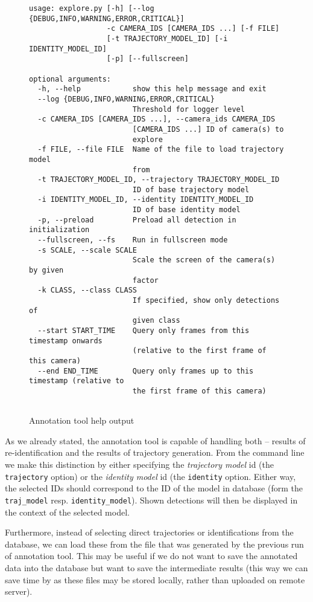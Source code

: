 \begin{figure}
    \begin{verbatim}
usage: explore.py [-h] [--log {DEBUG,INFO,WARNING,ERROR,CRITICAL}]
                  -c CAMERA_IDS [CAMERA_IDS ...] [-f FILE]
                  [-t TRAJECTORY_MODEL_ID] [-i IDENTITY_MODEL_ID]
                  [-p] [--fullscreen]

optional arguments:
  -h, --help            show this help message and exit
  --log {DEBUG,INFO,WARNING,ERROR,CRITICAL}
                        Threshold for logger level
  -c CAMERA_IDS [CAMERA_IDS ...], --camera_ids CAMERA_IDS
                        [CAMERA_IDS ...] ID of camera(s) to
                        explore
  -f FILE, --file FILE  Name of the file to load trajectory model
                        from
  -t TRAJECTORY_MODEL_ID, --trajectory TRAJECTORY_MODEL_ID
                        ID of base trajectory model
  -i IDENTITY_MODEL_ID, --identity IDENTITY_MODEL_ID
                        ID of base identity model
  -p, --preload         Preload all detection in initialization
  --fullscreen, --fs    Run in fullscreen mode
  -s SCALE, --scale SCALE
                        Scale the screen of the camera(s) by given
                        factor
  -k CLASS, --class CLASS
                        If specified, show only detections of
                        given class
  --start START_TIME    Query only frames from this timestamp onwards
                        (relative to the first frame of this camera)
  --end END_TIME        Query only frames up to this timestamp (relative to
                        the first frame of this camera)


    \end{verbatim}
    \caption{Annotation tool help output}
    \label{fig:annotation_tool_help}
\end{figure}

As we already stated, the annotation tool is capable of handling both -- results of re-identification and the results of trajectory generation. From the command line we
make this distinction by either specifying the \emph{trajectory model} id (the
\texttt{\-\-trajectory} option) or the \emph{identity model} id (the
\texttt{\-\-identity} option. Either way, the selected IDs should correspond to the
ID of the model in database (form the \texttt{traj\_model} resp. 
\texttt{identity\_model}). Shown detections will then be displayed in the context
of the selected model.

Furthermore, instead of selecting direct trajectories or identifications from the
database, we can load these from the file that was generated by the previous run of
annotation tool. This may be useful if we do not want to save the annotated data
into the database but want to save the intermediate results (this way we can save
time by as these files may be stored locally, rather than uploaded on remote
server).

